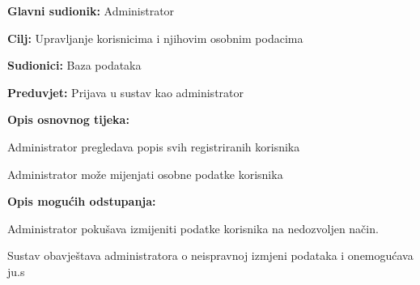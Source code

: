 \noindent {}
\begin{packed_item}
	
	\item \textbf{Glavni sudionik: }Administrator
	\item  \textbf{Cilj:} Upravljanje korisnicima i njihovim osobnim podacima
	\item  \textbf{Sudionici:} Baza podataka
	\item  \textbf{Preduvjet:} Prijava u sustav kao administrator
	\item  \textbf{Opis osnovnog tijeka:}
	
	\item[] \begin{packed_enum}
		
		\item Administrator pregledava popis svih registriranih korisnika
		\item Administrator može mijenjati osobne podatke korisnika
		
	\end{packed_enum}
	
	\item  \textbf{Opis mogućih odstupanja:}
	
	\item[] \begin{packed_item}
		
		\item[2.a] Administrator pokušava izmijeniti podatke korisnika na nedozvoljen način.
		\item[] \begin{packed_enum}
			
			\item Sustav obavještava administratora o neispravnoj izmjeni podataka i onemogućava ju.s
			
		\end{packed_enum}
		
	\end{packed_item}
	
\end{packed_item}

